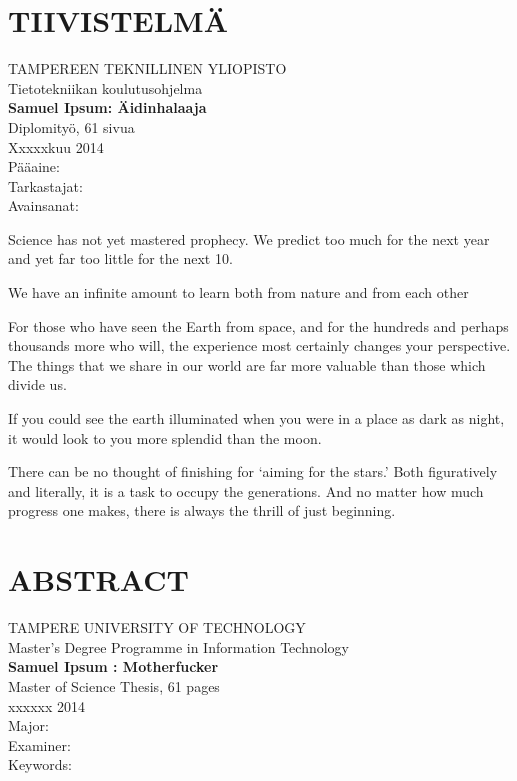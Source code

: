 \newpage
 
\setcounter{page}{1} %
 
\chapter*{TIIVISTELMÄ}
\begin{spacing}{1.0}
\textsf{TAMPEREEN TEKNILLINEN YLIOPISTO}\\
\textsf{Tietotekniikan koulutusohjelma}\\
{\bf \textsf{Samuel Ipsum: Äidinhalaaja}}\\
\textsf{Diplomityö, 61 sivua}\\
\textsf{Xxxxxkuu 2014}\\
\textsf{Pääaine: }\\
\textsf{Tarkastajat: }\\
\textsf{Avainsanat: }\\
\end{spacing}
 
\noindent
Science has not yet mastered prophecy. We predict too much for the next year and yet far too little for the next 10.

\noindent
We have an infinite amount to learn both from nature and from each other

\noindent
For those who have seen the Earth from space, and for the hundreds and perhaps thousands more who will, the experience most certainly changes your perspective. The things that we share in our world are far more valuable than those which divide us.

\noindent
If you could see the earth illuminated when you were in a place as dark as night, it would look to you more splendid than the moon.

\noindent
There can be no thought of finishing for ‘aiming for the stars.’ Both figuratively and literally, it is a task to occupy the generations. And no matter how much progress one makes, there is always the thrill of just beginning. 
 

\newpage
\chapter*{ABSTRACT}
\begin{spacing}{1.0}
\textsf{TAMPERE UNIVERSITY OF TECHNOLOGY}\\
\textsf{Master's Degree Programme in Information Technology}\\
{\bf \textsf{Samuel Ipsum : Motherfucker}}\\
\textsf{Master of Science Thesis, 61 pages}\\
\textsf{xxxxxx 2014}\\
\textsf{Major: }\\
\textsf{Examiner: }\\
\textsf{Keywords: }\\
\end{spacing}
 
